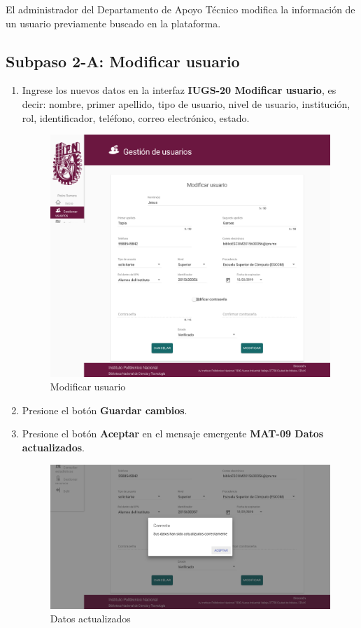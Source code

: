 El administrador del Departamento de Apoyo Técnico modifica la información de un usuario previamente buscado en la plataforma.

\subsection{Subpaso 2-A: Modificar usuario}
\begin{enumerate}
	\item Ingrese los nuevos datos en la interfaz
    \textbf{IUGS-20 Modificar usuario}, es decir: nombre, primer apellido, tipo de usuario, nivel de usuario, institución, rol, identificador, teléfono, correo electrónico, estado.

    \begin{figure}[hbtp]
	\includegraphics[scale=0.3]{images/Interfaz/IUGS-20 Modificar usuario.png}
	\caption{Modificar usuario}
	\end{figure}

\item Presione el botón \textbf{Guardar cambios}.
\item Presione el botón \textbf{Aceptar} en el mensaje emergente
\textbf{MAT-09 Datos actualizados}.

\begin{figure}[hbtp]
	\includegraphics[scale=0.3]{images/Interfaz/MAT-09 Datos actualizados.png}
	\caption{Datos actualizados}
	\end{figure}
\end{enumerate}

